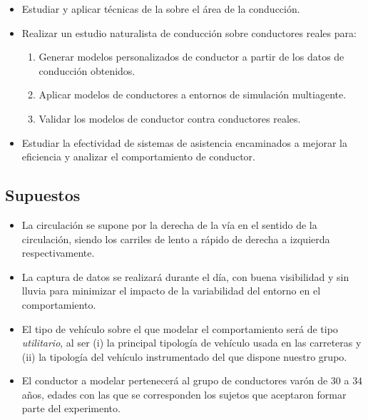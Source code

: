 \begin{itemize}
	\item Estudiar y aplicar técnicas de la  sobre el área de la conducción.
	\item Realizar un estudio naturalista de conducción sobre conductores reales para:
	\begin{enumerate}
		\item Generar modelos personalizados de conductor a partir de los datos de conducción obtenidos.
		\item Aplicar modelos de conductores a entornos de simulación multiagente.
		\item Validar los modelos de conductor contra conductores reales.
	\end{enumerate}
	\item Estudiar la efectividad de sistemas de asistencia encaminados a mejorar la eficiencia y analizar el comportamiento de conductor.
\end{itemize}

\subsection{Supuestos}

\begin{itemize}
	\item La circulación se supone por la derecha de la vía en el sentido de la circulación, siendo los carriles de lento a rápido de derecha a izquierda respectivamente.
	\item La captura de datos se realizará durante el día, con buena visibilidad y sin lluvia para minimizar el impacto de la variabilidad del entorno en el comportamiento.
	\item El tipo de vehículo sobre el que modelar el comportamiento será de tipo \textit{utilitario}, al ser (i) la principal tipología de vehículo usada en las carreteras y (ii) la tipología del vehículo instrumentado del que dispone nuestro grupo.
	\item El conductor a modelar pertenecerá al grupo de conductores varón de $30$ a $34$ años, edades con las que se corresponden los sujetos que aceptaron formar parte del experimento.
\end{itemize}

